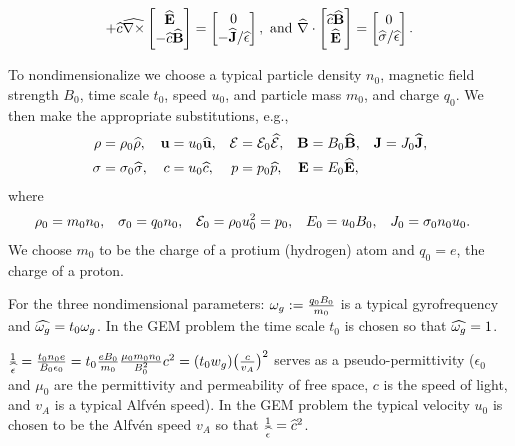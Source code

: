 \documentclass[12pt,fleqn]{article}
\numberwithin{equation}{section}
\begin{document}
\begin{gather*}
 + \widehat c \widehat {\nabla\times}
    \begin{bmatrix}
      \widehat{\mathbf{E}} \\
      -\widehat c\widehat{\mathbf{B}}
    \end{bmatrix}
 = \begin{bmatrix}
      0 \\
      -\widehat{\mathbf{J}}/{\widehat\epsilon}
    \end{bmatrix}, \hbox{ and }
  \widehat\nabla\cdot
   \begin{bmatrix}
     \widehat c\widehat{\mathbf{B}} \\
     \widehat{\mathbf{E}}
   \end{bmatrix}
 = \begin{bmatrix}
     0 \\
     \widehat{\sigma}/\widehat\epsilon
   \end{bmatrix}.
\end{gather*}

To nondimensionalize we choose a typical particle
density $n_0$, magnetic field strength $B_0$,
time scale $t_0$, speed $u_0$, and particle mass $m_0$,
and charge $q_0$.
We then make the appropriate substitutions, e.g., 
\begin{align*}
  \rho &=\rho_0\widehat\rho,
 &\mathbf{u}   &=u_0\widehat{\mathbf{u}},
 &\mathcal{E} &= \mathcal{E}_0\widehat{\mathcal{E}},
 &\mathbf{B} &= B_0\widehat{\mathbf{B}},
 &\mathbf{J} &= J_0\widehat{\mathbf{J}},
\\
  \sigma &= \sigma_0\widehat\sigma,
 &c    &=u_0\widehat c,
 &p &= p_0\widehat{p},
 &\mathbf{E} &= E_0\widehat{\mathbf{E}},
\end{align*}
where
\begin{align*}
  \rho_0 &= m_0 n_0,
 &\sigma_0 &= q_0 n_0,
 &\mathcal{E}_0 &= \rho_0 u_0^2 = p_0,
 &E_0 &= u_0 B_0,
 &J_0 &= \sigma_0 n_0 u_0.
\end{align*}
We choose $m_0$ to be the charge of a protium
(hydrogen) atom and $q_0=e$, the charge of a proton.

For the three nondimensional parameters:
$\omega_g:=\frac{q_0 B_0}{m_0}$
is a typical gyrofrequency and
$\widehat{\omega_g}=t_0\omega_g$.
In the GEM problem the time
scale $t_0$ is chosen so that $\widehat{\omega_g}=1$.

$\frac{1}{\widehat\epsilon} = \frac{t_0 n_0 e}{B_0 \epsilon_0}
   = t_0 \frac{e B_0}{m_0} \frac{\mu_0 m_0 n_0}{B_0^2} c^2
   = (t_0 w_g) \big(\frac{c}{v_A}\big)^2$
serves as a pseudo-permittivity
($\epsilon_0$ and $\mu_0$ are the permittivity 
and permeability of free space, $c$ is the
speed of light, and $v_A$ is a typical
Alfv\'en speed).  In the GEM problem the typical
velocity $u_0$ is chosen to be the Alfv\'en speed $v_A$
so that $\frac{1}{\widehat\epsilon} =\widehat c^2$.
\end{document}
